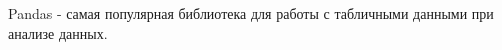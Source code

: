 Pandas - самая популярная библиотека для работы с табличными данными при анализе данных.

\codeExample


